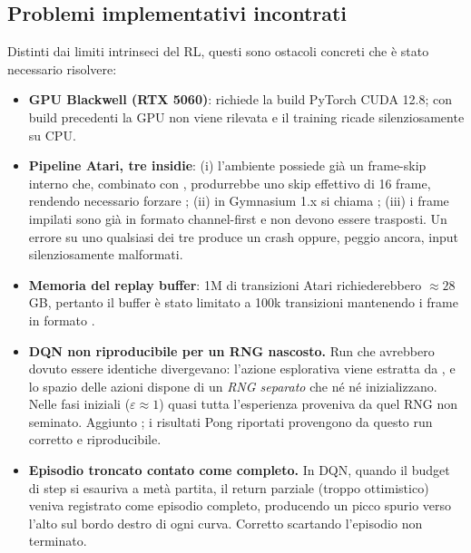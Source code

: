 \subsection{Problemi implementativi incontrati}
Distinti dai limiti intrinseci del RL, questi sono ostacoli concreti che \`e stato
necessario risolvere:
\begin{itemize}
  \item \textbf{GPU Blackwell (RTX 5060)}: richiede la build PyTorch CUDA 12.8; con
        build precedenti la GPU non viene rilevata e il training ricade silenziosamente
        su CPU.
  \item \textbf{Pipeline Atari, tre insidie}: (i) l'ambiente  possiede gi\`a
        un frame-skip interno che, combinato con , produrrebbe
        uno skip effettivo di 16 frame, rendendo necessario forzare
        ; (ii) in Gymnasium 1.x  si chiama
        ; (iii) i frame impilati sono gi\`a in formato
        channel-first  e non devono essere trasposti. Un errore su uno
        qualsiasi dei tre produce un crash oppure, peggio ancora, input silenziosamente
        malformati.
  \item \textbf{Memoria del replay buffer}: 1M di transizioni Atari
        richiederebbero $\approx 28$\,GB, pertanto il buffer \`e stato limitato a 100k
        transizioni mantenendo i frame in formato .
  \item \textbf{DQN non riproducibile per un RNG nascosto.} Run che avrebbero dovuto
        essere identiche divergevano: l'azione esplorativa viene estratta da
        , e lo spazio delle azioni dispone di un
        \emph{RNG separato} che n\'e  n\'e 
        inizializzano. Nelle fasi iniziali ($\varepsilon\!\approx\!1$) quasi tutta
        l'esperienza proveniva da quel RNG non seminato. Aggiunto
        ; i risultati Pong riportati provengono da
        questo run corretto e riproducibile.
  \item \textbf{Episodio troncato contato come completo.} In DQN, quando il budget di step si
        esauriva a met\`a partita, il return parziale (troppo ottimistico) veniva
        registrato come episodio completo, producendo un picco spurio verso l'alto sul
        bordo destro di ogni curva. Corretto scartando l'episodio non terminato.
\end{itemize}
